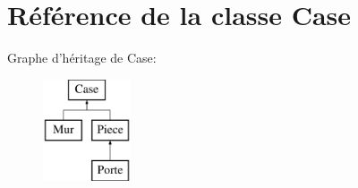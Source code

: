 \hypertarget{classCase}{\section{\-Référence de la classe \-Case}
\label{classCase}
}
\-Graphe d'héritage de \-Case\-:\begin{figure}[H]
\begin{center}
\leavevmode
\includegraphics[height=3.000000cm]{classCase}
\end{center}
\end{figure}
